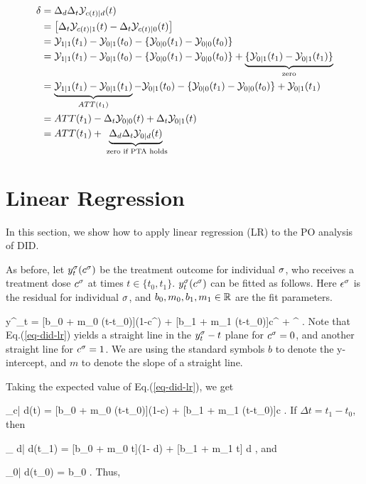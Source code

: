 \begin{align}
\delta&=
\Delta_ d\Delta_t  
{\cal Y}_{c(t)| d}(t)
\\
&=
\left[
\Delta_t {\cal Y}_{c(t)|1}(t)
-\Delta_t {\cal Y}_{c(t)|0}(t)
\right]
\\
&=
{\cal Y}_{1|1}(t_1)-{\cal Y}_{0|1}(t_0)
-\{
{\cal Y}_{0|0}(t_1)-{\cal Y}_{0|0}(t_0)
\}
\\
&=
{\cal Y}_{1|1}(t_1)-{\cal Y}_{0|1}(t_0)
-\{
{\cal Y}_{0|0}(t_1)-{\cal Y}_{0|0}(t_0)
\}
+\underbrace{
\{
{\cal Y}_{0|1}(t_1)-
{\cal Y}_{0|1}(t_1)
\}}_{\text{ zero }}
\\
&=
\underbrace{
{\cal Y}_{1|1}(t_1) - {\cal Y}_{0|1}(t_1)}
_{ATT(t_1)}
-{\cal Y}_{0|1}(t_0)
-\{
{\cal Y}_{0|0}(t_1)-{\cal Y}_{0|0}(t_0)
\}
 + {\cal Y}_{0|1}(t_1)
\\
&=
ATT(t_1)
-\Delta_t {\cal Y}_{0|0}(t)
+\Delta_t {\cal Y}_{0|1}(t)
\\
&=
ATT(t_1)
+
\underbrace{\Delta_ d\Delta_t{\cal Y}_{0| d}(t)}_
{\text{ zero if PTA holds}}
\end{align}





\section{Linear Regression}
In this
section,
we show how to apply
linear regression (LR)
to the PO analysis of DID.


As before, let
$y^\sigma_t(c^\sigma)$ be the treatment outcome
for individual $\sigma$,
who receives
a treatment dose
$c^\sigma$
at times $t\in\{t_0, t_1\}$.
$y^\sigma_t(c^\sigma)$
can be fitted as follows.
Here $\epsilon^\sigma$
is the residual
for individual $\sigma$,
and $b_0, m_0, b_1, m_1\in { \mathbb{R}}$
are the fit parameters.

\beq
y^\s_t = [b_0 + m_0 (t-t_0)](1-c^\s)
+  [b_1 + m_1 (t-t_0)]c^\s
+ \eps^\s
\;.
\label{eq-did-lr}
\eeq  
Note that Eq.(\ref{eq-did-lr})
 yields a straight line
in the $y^\sigma_t-t$ plane
for $c^\sigma=0$,
and another 
straight line for $c^\sigma=1$.
We are
using the
standard symbols
$b$ to denote
the y-intercept, and $m$ 
to denote the slope
of a straight line.

Taking the expected value
of Eq.(\ref{eq-did-lr}), we get

\beq
\caly_{c| d}(t) = 
[b_0 + m_0 (t-t_0)](1-c)
+  [b_1 + m_1 (t-t_0)]c
\;.
\eeq  
If $\Delta  t = t_1-t_0$, then

\beq
\caly_{ d| d}(t_1) = 
[b_0 + m_0 \Delta t](1- d)
+  [b_1 + m_1 \Delta t] d
\;,
\eeq
and

\beq
\caly_{0| d}(t_0) = b_0
\;.
\eeq
 Thus,   

